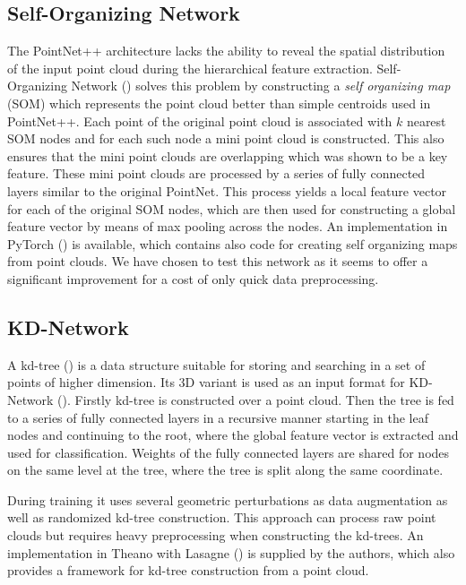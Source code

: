 \subsection{Self-Organizing Network}
The PointNet++ architecture lacks the ability to reveal the spatial distribution of the input point cloud during the hierarchical feature extraction. Self-Organizing Network (\cite{li_so-net:_2018}) solves this problem by constructing a \textit{self organizing map} (SOM) which represents the point cloud better than simple centroids used in PointNet++. Each point of the original point cloud is associated with $k$ nearest SOM nodes and for each such node a mini point cloud is constructed. This also ensures that the mini point clouds are overlapping which was shown to be a key feature. These mini point clouds are processed by a series of fully connected layers similar to the original PointNet. This process yields a local feature vector for each of the original SOM nodes, which are then used for constructing a global feature vector by means of max pooling across the nodes. An implementation in PyTorch (\cite{li_sonet_2018}) is available, which contains also code for creating self organizing maps from point clouds. We have chosen to test this network as it seems to offer a significant improvement for a cost of only quick data preprocessing.

\subsection{KD-Network}
A kd-tree (\cite{bentley_multidimensional_1975}) is a data structure suitable for storing and searching in a set of points of higher dimension. Its 3D variant is used as an input format for KD-Network (\cite{klokov_escape_2017}). Firstly kd-tree is constructed over a point cloud. Then the tree is fed to a series of fully connected layers in a recursive manner starting in the leaf nodes and continuing to the root, where the global feature vector is extracted and used for classification. Weights of the fully connected layers are shared for nodes on the same level at the tree, where the tree is split along the same coordinate. \par
During training it uses several geometric perturbations as data augmentation as well as randomized kd-tree construction. This approach can process raw point clouds but requires heavy preprocessing when constructing the kd-trees.
An implementation in Theano with Lasagne (\cite{klokov_kd-net_2017}) is supplied by the authors, which also provides a framework for kd-tree construction from a point cloud.

